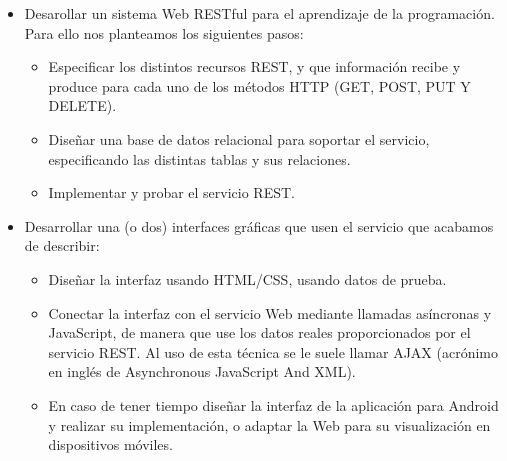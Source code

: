 \begin{itemize}
\item
Desarollar un sistema Web RESTful para el aprendizaje de la programación. Para ello nos planteamos los siguientes pasos:

\begin{itemize}
\item
Especificar los distintos recursos REST, y que información recibe y produce para cada uno de los métodos HTTP (GET, POST, PUT Y DELETE).

\item
Diseñar una base de datos relacional para soportar el servicio, especificando las distintas tablas y sus relaciones.

\item
Implementar y probar el servicio REST.

\end{itemize}

\item
Desarrollar una (o dos) interfaces gráficas que usen el servicio que acabamos de describir:

\begin{itemize}
\item
Diseñar la interfaz usando HTML/CSS, usando datos de prueba.

\item
Conectar la interfaz con el servicio Web mediante llamadas asíncronas y JavaScript, de manera que use los datos reales proporcionados por el servicio REST. Al uso de esta técnica se le suele llamar AJAX (acrónimo en inglés de Asynchronous JavaScript And XML).

\item
En caso de tener tiempo diseñar la interfaz de la aplicación para Android y realizar su implementación, o adaptar la Web para su visualización en dispositivos móviles.

\end{itemize}

\end{itemize}
